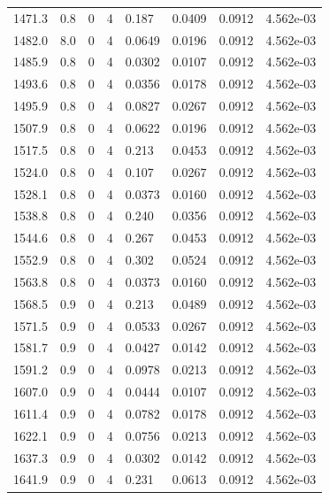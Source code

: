 \documentclass[preview]{standalone}
\begin{document}
{{{{{{{\begin{tabular}{L{1.2cm}C{1.2cm} C{0.3cm}C{0.5cm} C{1.4cm}C{1.4cm} C{1.4cm}C{1.4cm}}
  1471.3  &   0.8  & 0     &  4 &  0.187  & 0.0409  & 0.0912 &  4.562e-03   \\ 
  1482.0  &   8.0  & 0     &  4 &  0.0649  & 0.0196  & 0.0912 &  4.562e-03   \\ 
  1485.9  &   0.8  & 0     &  4 &  0.0302  & 0.0107  & 0.0912 &  4.562e-03   \\ 
  1493.6  &   0.8  & 0     &  4 &  0.0356  & 0.0178  & 0.0912 &  4.562e-03   \\ 
  1495.9  &   0.8  & 0     &  4 &  0.0827  & 0.0267  & 0.0912 &  4.562e-03   \\ 
  1507.9  &   0.8  & 0     &  4 &  0.0622  & 0.0196  & 0.0912 &  4.562e-03   \\ 
  1517.5  &   0.8  & 0     &  4 &  0.213  & 0.0453  & 0.0912 &  4.562e-03   \\ 
  1524.0  &   0.8  & 0     &  4 &  0.107  & 0.0267  & 0.0912 &  4.562e-03   \\ 
  1528.1  &   0.8  & 0     &  4 &  0.0373  & 0.0160  & 0.0912 &  4.562e-03   \\ 
  1538.8  &   0.8  & 0     &  4 &  0.240  & 0.0356  & 0.0912 &  4.562e-03   \\ 
  1544.6  &   0.8  & 0     &  4 &  0.267  & 0.0453  & 0.0912 &  4.562e-03   \\ 
  1552.9  &   0.8  & 0     &  4 &  0.302  & 0.0524  & 0.0912 &  4.562e-03   \\ 
  1563.8  &   0.8  & 0     &  4 &  0.0373  & 0.0160  & 0.0912 &  4.562e-03   \\ 
  1568.5  &   0.9  & 0     &  4 &  0.213  & 0.0489  & 0.0912 &  4.562e-03   \\ 
  1571.5  &   0.9  & 0     &  4 &  0.0533  & 0.0267  & 0.0912 &  4.562e-03   \\ 
  1581.7  &   0.9  & 0     &  4 &  0.0427  & 0.0142  & 0.0912 &  4.562e-03   \\ 
  1591.2  &   0.9  & 0     &  4 &  0.0978  & 0.0213  & 0.0912 &  4.562e-03   \\ 
  1607.0  &   0.9  & 0     &  4 &  0.0444  & 0.0107  & 0.0912 &  4.562e-03   \\ 
  1611.4  &   0.9  & 0     &  4 &  0.0782  & 0.0178  & 0.0912 &  4.562e-03   \\ 
  1622.1  &   0.9  & 0     &  4 &  0.0756  & 0.0213  & 0.0912 &  4.562e-03   \\ 
  1637.3  &   0.9  & 0     &  4 &  0.0302  & 0.0142  & 0.0912 &  4.562e-03   \\ 
  1641.9  &   0.9  & 0     &  4 &  0.231  & 0.0613  & 0.0912 &  4.562e-03   \\ 

\end{tabular}}}}}}}}
\end{document}
